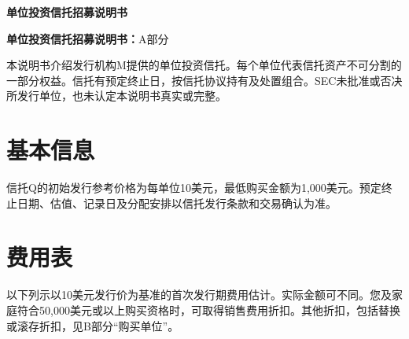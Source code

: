 \documentclass[UTF8,fontset=none,11pt,a4paper]{ctexart}
\begin{document}
{\noindent\fontsize{20}{25}\selectfont\bfseries 单位投资信托招募说明书\par}
\vspace{10pt}
\textbf{单位投资信托招募说明书：}A部分


本说明书介绍发行机构M提供的单位投资信托。每个单位代表信托资产不可分割的一部分权益。信托有预定终止日，按信托协议持有及处置组合。SEC未批准或否决所发行单位，也未认定本说明书真实或完整。


\section*{基本信息}
信托Q的初始发行参考价格为每单位10美元，最低购买金额为1,000美元。预定终止日期、估值、记录日及分配安排以信托发行条款和交易确认为准。


\section*{费用表}
以下列示以10美元发行价为基准的首次发行期费用估计。实际金额可不同。您及家庭符合50,000美元或以上购买资格时，可取得销售费用折扣。其他折扣，包括替换或滚存折扣，见B部分“购买单位”。
\end{document}
